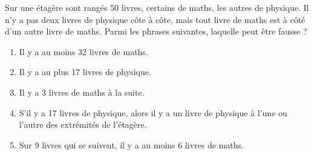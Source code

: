 Sur une étagère sont rangés 50 livres, certains de maths, les autres de physique. Il n'y a pas
deux livres de physique côte à côte, mais tout livre de maths est à côté d'un autre livre de maths. Parmi les phrases suivantes, laquelle peut être fausse ?
\begin{multicols}{2}
  \begin{enumerate}[A/]
  \item Il y a au moins 32 livres de maths.
  \item Il y a au plus 17 livres de physique.
  \item Il y a 3 livres de maths à la suite.
  \item S'il y a 17 livres de physique, alors il y a un livre de physique à l'une ou l'autre des extrémités de l'étagère.
  \item Sur 9 livres qui se suivent, il y a au moins 6 livres de maths.
  \end{enumerate}
\end{multicols}